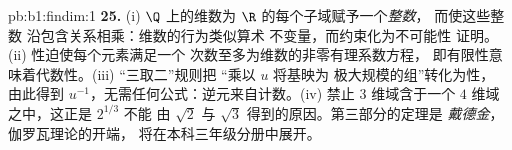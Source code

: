 \begin{solution}{pb:b1:findim:1}
\textbf{25.} (i) $\Q$ 上的维数为 $\R$ 的每个子域赋予一个\emph{整数}，
而使这些整数
沿包含关系相乘：维数的行为类似算术
不变量，而约束化为不可能性
证明。(ii) 性迫使每个元素满足一个
次数至多为维数的非零有理系数方程，
即有限性意味着代数性。(iii) “三取二”规则把
“乘以 $u$ 将基映为
极大规模的组”转化为性，
由此得到 $u^{-1}$，无需任何公式：逆元来自计数。(iv) 
禁止 $3$ 维域含于一个
$4$ 维域之中，这正是 $2^{1/3}$ 不能
由 $\sqrt2$ 与 $\sqrt3$ 得到的原因。第三部分的定理是
\emph{戴德金}，伽罗瓦理论的开端，
将在本科三年级分册中展开。
\end{solution}
